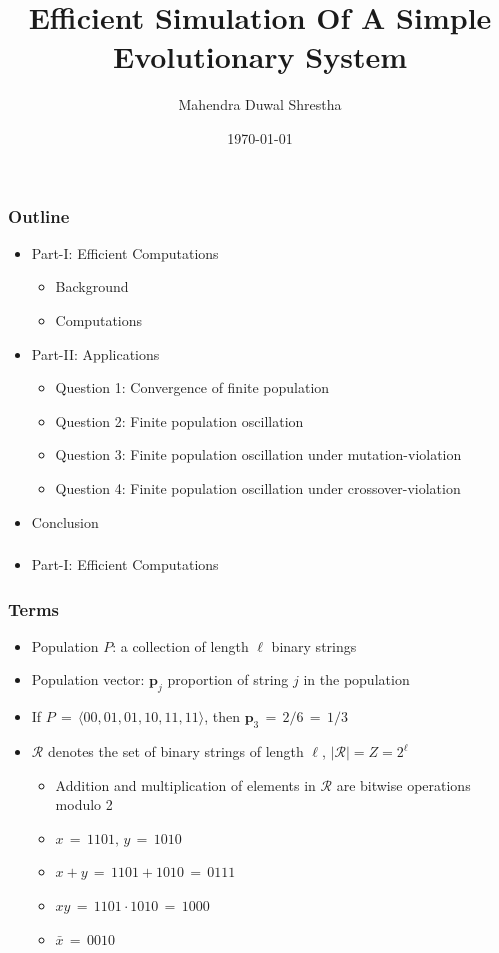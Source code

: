 \documentclass[aspectratio=169]{beamer}
\title{Efficient Simulation Of A Simple Evolutionary System}
\author{Mahendra Duwal Shrestha}
\institute{The University Of Tenessee}
\date{\today}
\begin{document}
  \begin{frame}
    \titlepage
  \end{frame}

  \begin{frame}
    \frametitle{Outline}
    \begin{itemize}
      \item Part-I: Efficient Computations
	\begin{itemize}
	  \item{Background}
	  \item{Computations}
	\end{itemize}
      \item Part-II: Applications
      \begin{itemize}
	\item{Question 1: Convergence of finite population}
	\item{Question 2: Finite population oscillation}
	\item{Question 3: Finite population oscillation under mutation-violation}
	\item{Question 4: Finite population oscillation under crossover-violation}
      \end{itemize}
      \item{Conclusion}
    \end{itemize}
  \end{frame}
  
  \begin{frame}
    \frametitle{}
    \begin{itemize}
      \item Part-I: Efficient Computations
      \end{itemize}
    \end{frame}
  
  \begin{frame}
    \frametitle{Terms}
    \begin{itemize}
      \item{Population $P$: a collection of length $\ell$ binary strings}
      \item{Population vector: $\bm{p}_j$ proportion of string $j$ in the population}
      \item{If $P \,=\, \langle 00, 01, 01, 10, 11, 11 \rangle$, then $\bm{p}_3 \,=\, 2/6 \,=\, 1/3$}
      \vspace{0.1in}%
      \item{$\mathcal{R}$ denotes the set of binary strings of length $\ell$, $|\mathcal{R}| = Z = 2^\ell$ }
      \begin{itemize}
	\item{Addition and multiplication of elements in $\mathcal{R}$ are bitwise operations modulo 2}
	\item{$x \,=\, 1101,\, y \,=\, 1010 $}
	\item{$x + y \,=\, 1101 + 1010 \,=\, 0111$}
	\item{$xy \,=\, 1101 \cdot 1010 \,=\, 1000$}
	\item{$\bar{x} \,=\, 0010$}
      \end{itemize}
    \end{itemize}
  \end{frame}
  
\end{document}
